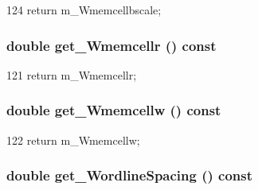 \begin{DoxyCode}
124 { return m_Wmemcellbscale; }
\end{DoxyCode}
\hypertarget{classTechParameter_ae7783acf5faa6167d4fafeb3edb5b6e2}{
\subsubsection[{get\_\-Wmemcellr}]{\setlength{\rightskip}{0pt plus 5cm}double get\_\-Wmemcellr () const}}
\label{classTechParameter_ae7783acf5faa6167d4fafeb3edb5b6e2}



\begin{DoxyCode}
121 { return m_Wmemcellr; }
\end{DoxyCode}
\hypertarget{classTechParameter_aa701d7d8fbd2923110f5fce66074ebf8}{
\subsubsection[{get\_\-Wmemcellw}]{\setlength{\rightskip}{0pt plus 5cm}double get\_\-Wmemcellw () const}}
\label{classTechParameter_aa701d7d8fbd2923110f5fce66074ebf8}



\begin{DoxyCode}
122 { return m_Wmemcellw; }
\end{DoxyCode}
\hypertarget{classTechParameter_ac8316ab367cecbe21444c837c5733f72}{
\subsubsection[{get\_\-WordlineSpacing}]{\setlength{\rightskip}{0pt plus 5cm}double get\_\-WordlineSpacing () const}}
\label{classTechParameter_ac8316ab367cecbe21444c837c5733f72}



